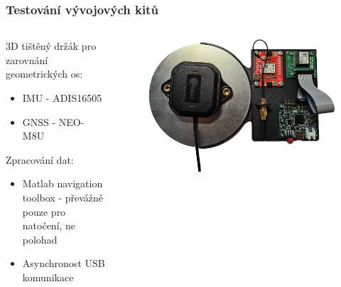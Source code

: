 \documentclass[%
  12pt,       				%
	t,                  %
	aspectratio=1610,   %
	unicode,						%
]{beamer}				    	%
\begin{document}
\begin{frame} 
	\frametitle{Testování vývojových kitů}
	
	\begin{columns}[T] 								%
		\begin{column}{0.3\textwidth}		%
			3D tištěný držák pro zarovnání geometrických os:
			\begin{itemize}
				\item IMU - ADIS16505
				\item GNSS - NEO-M8U
			\end{itemize}
			\vspace{0.5cm}
			Zpracování dat:
			\begin{itemize}
				\item Matlab navigation toolbox - převážně pouze pro natočení, ne polohad
				\item Asynchronost USB komunikace
			\end{itemize}
		\end{column}
		\begin{column}{0.7\textwidth}		%
			\begin{figure}%
				\centering
				\includegraphics[width=1\columnwidth]{obrazky/devBoards}
			\end{figure}
		\end{column}
	\end{columns}						
			

	
\end{frame} 
\end{document}

